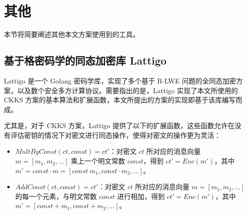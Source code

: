 \section{其他}

本节将简要阐述其他本文方案使用到的工具。

\subsection{基于格密码学的同态加密库 Lattigo}

Lattigo 是一个 Golang 密码学库，实现了多个基于 R-LWE 问题的全同态加密方案，以及数个安全多方计算协议\cite{Mouchet2020LattigoAM,lattigoRepo}。需要指出的是，Lattigo 实现了本文所使用的 CKKS 方案的基本算法和扩展函数，本文所提出的方案的实现即基于该库编写而成。



尤其是，对于 CKKS 方案，Lattigo 提供了以下的扩展函数，这些函数允许在没有评估密钥的情况下对密文进行同态操作，使得对密文的操作更为灵活：

\begin{itemize}
    \item $MultByConst(ct, const) = ct'$：对密文 $ct$ 所对应的消息向量 $m = [m_1, m_2, \dots]$ 乘上一个明文常数 $const$，得到 $ct' = Enc(m')$，其中 $m' = const \cdot m  = [const \ m_1, const \cdot m_2, \dots]$。
    \item $AddConst(ct, const) = ct'$：对密文 $ct$ 所对应的消息向量 $m = [m_1, m_2, \dots]$ 的每一个元素，与明文常数 $const$ 进行相加，得到 $ct' = Enc(m')$，其中 $m' = [const + m_1, const + m_2, \dots]$。
\end{itemize}

